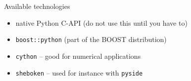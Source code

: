 \begin{frame}[fragile]{Available technologies}
    
    \begin{itemize}
        \setlength{\itemsep}{0.075\textheight}
        \item native Python C-API (do not use this until you have to)
        \item \texttt{boost::python} (part of the BOOST distribution)
        \item \texttt{cython} -- good for numerical applications
        \item \texttt{sheboken} -- used for instance with \texttt{pyside}
    \end{itemize}
\end{frame}

